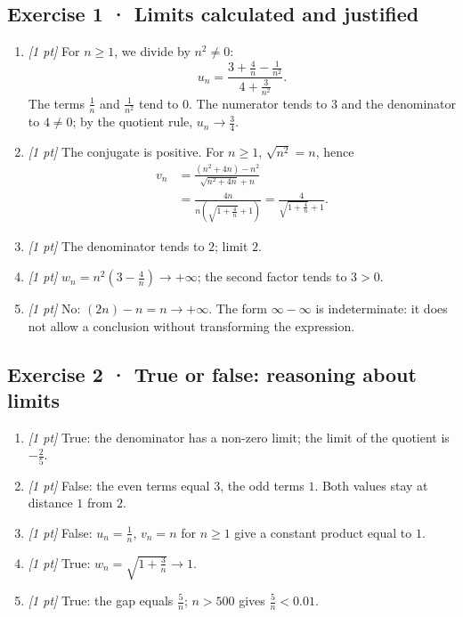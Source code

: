 \subsection*{Exercise 1 · Limits calculated and justified}\begin{enumerate}

\item \textit{[1 pt]} For $n\ge1$, we divide by $n^2\ne0$:
\[u_n=\frac{3+\frac{4}{n}-\frac{1}{n^2}}{4+\frac{3}{n^2}}.\]
The terms $\frac{1}{n}$ and $\frac{1}{n^2}$ tend to $0$. The numerator tends to $3$ and the denominator to $4\ne0$; by the quotient rule, $u_n\to\frac{3}{4}$.

\item \textit{[1 pt]} The conjugate is positive. For $n\ge1$, $\sqrt{n^2}=n$, hence
\[\begin{aligned}v_n&=\frac{(n^2+4n)-n^2}{\sqrt{n^2+4n}+n}\\&=\frac{4n}{n(\sqrt{1+\frac{4}{n}}+1)}=\frac{4}{\sqrt{1+\frac{4}{n}}+1}.\end{aligned}\]

\item \textit{[1 pt]} The denominator tends to $2$; limit $2$.

\item \textit{[1 pt]} $w_n=n^2(3-\frac{4}{n})\to+\infty$; the second factor tends to $3>0$.

\item \textit{[1 pt]} No: $(2n)-n=n\to+\infty$. The form $\infty-\infty$ is indeterminate: it does not allow a conclusion without transforming the expression.

\end{enumerate}

\subsection*{Exercise 2 · True or false: reasoning about limits}\begin{enumerate}

\item \textit{[1 pt]} True: the denominator has a non-zero limit; the limit of the quotient is $-\frac{2}{5}$.

\item \textit{[1 pt]} False: the even terms equal $3$, the odd terms $1$. Both values stay at distance $1$ from $2$.

\item \textit{[1 pt]} False: $u_n=\frac{1}{n}$, $v_n=n$ for $n\ge1$ give a constant product equal to $1$.

\item \textit{[1 pt]} True: $w_n=\sqrt{1+\frac{3}{n}}\to1$.

\item \textit{[1 pt]} True: the gap equals $\frac{5}{n}$; $n>500$ gives $\frac{5}{n}<\num{0,01}$.

\end{enumerate}

